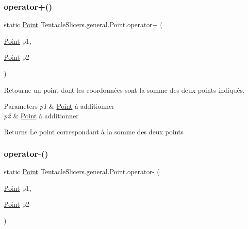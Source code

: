 \subsubsection{\texorpdfstring{operator+()}{operator+()}}
{\footnotesize\ttfamily static \hyperlink{class_tentacle_slicers_1_1general_1_1_point}{Point} Tentacle\+Slicers.\+general.\+Point.\+operator+ (\begin{DoxyParamCaption}\item[{\hyperlink{class_tentacle_slicers_1_1general_1_1_point}{Point}}]{p1,  }\item[{\hyperlink{class_tentacle_slicers_1_1general_1_1_point}{Point}}]{p2 }\end{DoxyParamCaption})\hspace{0.3cm}{\ttfamily [static]}}



Retourne un point dont les coordonnées sont la somme des deux points indiqués. 


\begin{DoxyParams}{Parameters}
{\em p1} & \hyperlink{class_tentacle_slicers_1_1general_1_1_point}{Point} à additionner \\
\hline
{\em p2} & \hyperlink{class_tentacle_slicers_1_1general_1_1_point}{Point} à additionner \\
\hline
\end{DoxyParams}
\begin{DoxyReturn}{Returns}
Le point correspondant à la somme des deux points 
\end{DoxyReturn}
\mbox{\label{class_tentacle_slicers_1_1general_1_1_point_a6dfc5efa00ae6d581418027b22b4d3ed}} 
\subsubsection{\texorpdfstring{operator-\/()}{operator-()}\hspace{0.1cm}{\footnotesize\ttfamily [1/2]}}
{\footnotesize\ttfamily static \hyperlink{class_tentacle_slicers_1_1general_1_1_point}{Point} Tentacle\+Slicers.\+general.\+Point.\+operator-\/ (\begin{DoxyParamCaption}\item[{\hyperlink{class_tentacle_slicers_1_1general_1_1_point}{Point}}]{p1,  }\item[{\hyperlink{class_tentacle_slicers_1_1general_1_1_point}{Point}}]{p2 }\end{DoxyParamCaption})\hspace{0.3cm}{\ttfamily [static]}}



